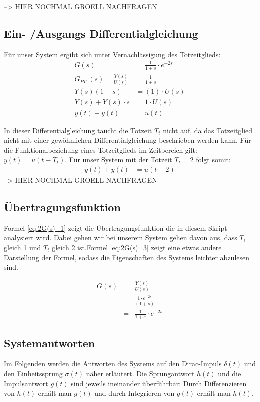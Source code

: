 --> HIER NOCHMAL GROELL NACHFRAGEN

\subsection{Ein- /Ausgangs Differentialgleichung}
Für unser System ergibt sich unter Vernachlässigung des Totzeitglieds:
\begin{align*}
    G(s) &= \frac{1}{1 + s} \cdot e^{-2s}\\
G_{PT_1}(s) =\frac{Y(s)}{U(s)} &= \frac{1}{1 + s} \\
Y(s)(1+s) &= (1) \cdot U(s) \\
Y(s) + Y(s) \cdot s &= 1\cdot U(s) \\
\dot y(t) + y(t) &= u(t) 
\end{align*}

In dieser Differentialgleichung taucht die Totzeit $T_t$ nicht auf, da das Totzeitglied nicht mit einer gewöhnlichen Differentialgleichung beschrieben werden kann. Für die Funktionalbeziehung eines Totzeitglieds im Zeitbereich gilt: $y(t) = u(t-T_t)$. Für unser System mit der Totzeit $T_t = 2$ folgt somit:
\begin{align*}
    \dot y(t) + y(t) &= u(t - 2) 
\end{align*}
--> HIER NOCHMAL GROELL NACHFRAGEN



\subsection{Übertragungsfunktion}

Formel \ref{eq:2G(s)_1} zeigt die Übertragungsfunktion die in diesem Skript analysiert wird. Dabei gehen wir bei unserem System gehen davon aus, dass $T_1$ gleich 1 und $T_t$ gleich 2 ist.Formel \ref{eq:2G(s)_3} zeigt eine etwas andere Darstellung der Formel, sodass die Eigenschaften des Systems leichter abzulesen sind.

\begin{eqnarray}
    \label{eq:2G(s)_1}
    G(s) &=& \frac{Y(s)}{U(s)} \\
    \label{eq:2G(s)_2}
    &=& \frac{1 \cdot e^{-2s}}{(1+s)} \\
    \label{eq:2G(s)_3}
    &=& \frac{1}{1 + s} \cdot e^{-2s}
\end{eqnarray}

\subsection{Systemantworten}
Im Folgenden werden die Antworten des Systems auf den Dirac-Impuls $\delta(t)$ und den Einheitssprung $\sigma (t)$ näher erläutert.
Die Sprungantwort $h(t)$ und die Impulsantwort $g(t)$ sind jeweils ineinander überführbar: Durch Differenzieren von $h(t)$ erhält man $g(t)$ und durch Integrieren von $g(t)$ erhält man $h(t)$.
